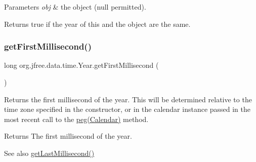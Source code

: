 \begin{DoxyParams}{Parameters}
{\em obj} & the object ({\ttfamily null} permitted).\\
\hline
\end{DoxyParams}
\begin{DoxyReturn}{Returns}
{\ttfamily true} if the year of this and the object are the same. 
\end{DoxyReturn}
\mbox{\label{classorg_1_1jfree_1_1data_1_1time_1_1_year_ad4c7220e5cd2c321ff4108c7a73ff68b}} 
\subsubsection{\texorpdfstring{get\+First\+Millisecond()}{getFirstMillisecond()}\hspace{0.1cm}{\footnotesize\ttfamily [1/2]}}
{\footnotesize\ttfamily long org.\+jfree.\+data.\+time.\+Year.\+get\+First\+Millisecond (\begin{DoxyParamCaption}{ }\end{DoxyParamCaption})}

Returns the first millisecond of the year. This will be determined relative to the time zone specified in the constructor, or in the calendar instance passed in the most recent call to the \mbox{\hyperlink{classorg_1_1jfree_1_1data_1_1time_1_1_year_a98c518e97ade2b6267e1b421b0f91162}{peg(\+Calendar)}} method.

\begin{DoxyReturn}{Returns}
The first millisecond of the year.
\end{DoxyReturn}
\begin{DoxySeeAlso}{See also}
\mbox{\hyperlink{classorg_1_1jfree_1_1data_1_1time_1_1_year_a57299a0e16c221eebc2f69e9daefc6ff}{get\+Last\+Millisecond()}} 
\end{DoxySeeAlso}
\mbox{\label{classorg_1_1jfree_1_1data_1_1time_1_1_year_aee8afd7f92299328416efdf15465ae8a}} 
